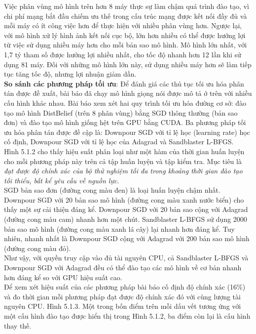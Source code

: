 \documentclass[11pt,a4paper]{article}
\numberwithin{equation}{subsection}
\numberwithin{figure}{subsection}
\numberwithin{table}{subsection}
\begin{document}
Việc phân vùng mô hình trên hơn 8 máy thực sự làm chậm quá trình đào tạo, vì chi phí mạng bắt đầu chiếm ưu thế trong cấu trúc mạng được kết nối đầy đủ và mỗi máy có ít công việc hơn để thực hiện với nhiều phân vùng hơn. Ngược lại, với mô hình xử lý hình ảnh kết nối cục bộ, lớn hơn nhiều có thể được hưởng lợi từ việc sử dụng nhiều máy hơn cho mỗi bản sao mô hình. Mô hình lớn nhất, với 1,7 tỷ tham số được hưởng lợi nhiều nhất, cho tốc độ nhanh hơn 12 lần khi sử dụng 81 máy. Đối với những mô hình lớn này, sử dụng nhiều máy hơn sẽ làm tiếp tục tăng tốc độ, nhưng lợi nhuận giảm dần.\\

\textbf{So sánh các phương pháp tối ưu}:  Để đánh giá các thủ tục tối ưu hóa phân tán được đề xuất, bài báo đã chạy mô hình giọng nói được mô tả ở trên với nhiều cấu hình khác nhau. Bài báo xem xét hai quy trình tối ưu hóa đường cơ sở: đào tạo mô hình DistBelief (trên 8 phân vùng) bằng SGD thông thường (bản sao đơn) và đào tạo mô hình giống hệt trên GPU bằng CUDA. Ba phương pháp tối ưu hóa phân tán được đề cập là: Downpour SGD với tỉ lệ học (learning rate) học cố định, Downpour SGD với tỉ lệ học của Adagrad và Sandblaster L-BFGS.\\

Hình 5.1.2 cho thấy hiệu suất phân loại như một hàm của thời gian huấn luyện cho mỗi phương pháp này trên cả tập huấn luyện và tập kiểm tra. Mục tiêu là \textit{ đạt được độ chính xác của bộ thử nghiệm tối đa trong khoảng thời gian đào tạo tối thiểu, bất kể yêu cầu về nguồn lực}.\\

SGD bản sao đơn (đường cong màu đen) là loại huấn luyện chậm nhất. Downpour SGD với 20 bản sao mô hình (đường cong màu xanh nước biển) cho thấy một sự cải thiện đáng kể. Downpour SGD với 20 bản sao cộng với Adagrad (đường cong màu cam) nhanh hơn một chút. Sandblaster L-BFGS sử dụng 2000 bản sao mô hình (đường cong màu xanh lá cây) lại nhanh hơn đáng kể. Tuy nhiên, nhanh nhất là Downpour SGD cộng với Adagrad với 200 bản sao mô hình (đường cong màu đỏ).\\

Như vậy, với quyền truy cập vào đủ tài nguyên CPU, cả Sandblaster L-BFGS và Downpour SGD với Adagrad đều có thể đào tạo các mô hình về cơ bản nhanh hơn đáng kể so với GPU hiệu suất cao.\\

Để xem xét hiệu suất của các phương pháp bài báo cố định  độ chính xác (16\%) và đo thời gian mỗi phương pháp đạt được độ chính xác đó với cùng lượng tài nguyên CPU. Hình 5.1.3. Một trong bốn điểm trên mỗi dấu vết tương ứng với một cấu hình đào tạo được hiển thị trong Hình 5.1.2, ba điểm còn lại là cấu hình thay thế.
\end{document}
